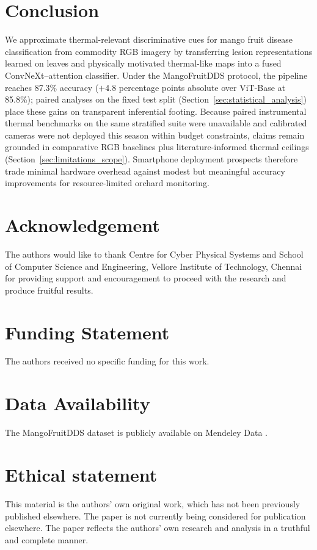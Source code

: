 \documentclass[utf8]{FrontiersinHarvard} %
\begin{document}
\FloatBarrier
\section{Conclusion}
We approximate thermal-relevant discriminative cues for mango fruit disease classification from commodity RGB imagery by transferring lesion representations learned on leaves and physically motivated thermal-like maps into a fused ConvNeXt--attention classifier. Under the MangoFruitDDS protocol, the pipeline reaches 87.3\% accuracy (\(+\)4.8 percentage points absolute over ViT-Base at 85.8\%); paired analyses on the fixed test split (Section~\ref{sec:statistical_analysis}) place these gains on transparent inferential footing. Because paired instrumental thermal benchmarks on the same stratified suite were unavailable and calibrated cameras were not deployed this season within budget constraints, claims remain grounded in comparative RGB baselines plus literature-informed thermal ceilings (Section~\ref{sec:limitations_scope}). Smartphone deployment prospects therefore trade minimal hardware overhead against modest but meaningful accuracy improvements for resource-limited orchard monitoring.


\section*{Acknowledgement}
The authors would like to thank Centre for Cyber Physical Systems and School of Computer Science and Engineering, Vellore Institute of Technology, Chennai for providing support and encouragement to proceed with the research and produce fruitful results.

\section*{Funding Statement}
The authors received no specific funding for this work.

\section*{Data Availability}
The MangoFruitDDS dataset is publicly available on Mendeley Data \cite{MendeleyDataset}.

\section*{Ethical statement}
This material is the authors' own original work, which has not been previously published elsewhere. The paper is not currently being considered for publication elsewhere. The paper reflects the authors' own research and analysis in a truthful and complete manner.
\end{document}
